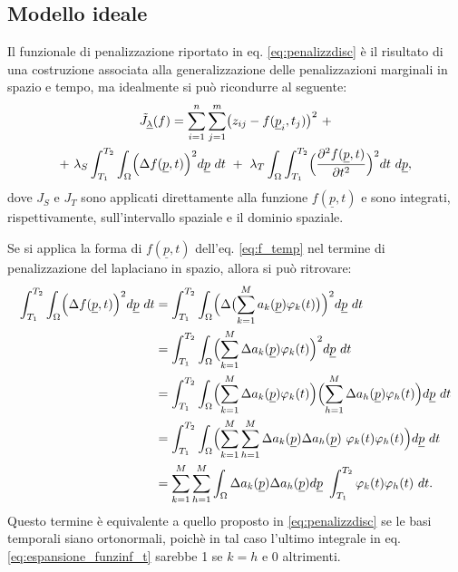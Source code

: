 \documentclass[a4paper,11pt,twoside,openright]{book}							%
\begin{document}
\subsection{Modello ideale}
Il funzionale di penalizzazione riportato in eq. \ref{eq:penalizzdisc} è il risultato di una costruzione associata alla generalizzazione delle penalizzazioni marginali in spazio e tempo, ma idealmente si può ricondurre al seguente:
\begin{multline}
\label{eq:Jfunc_cont}
\tilde J_{\underline \lambda }(f) = \sum_{i=1}^n \sum_{j=1}^m \bigl( z_{ij} - f(\underline p_i,t_j) \bigr)^2 \ + \\+\   \lambda_S \int_{T_1}^{T_2} \int_\Omega \Bigl( \Delta f(\underline p, t)  \Bigr)^2 d\underline p\ dt \ +\  \lambda_T \int_\Omega \int_{T_1}^{T_2} \Bigl( \frac{\partial^2 f(\underline p, t) }{\partial t ^2} \Bigr)^2 dt\ d\underline p ,
\end{multline}
dove $J_S$ e $J_T$ sono applicati direttamente alla funzione $f(\underline p, t)$ e sono integrati, rispettivamente, sull'intervallo spaziale e il dominio spaziale.

Se si applica la forma di $f(\underline p,t)$ dell'eq. \ref{eq:f_temp} nel termine di penalizzazione del laplaciano in spazio, allora si può ritrovare:
\begin{equation} 
\label{eq:espansione_funzinf_t}
\begin{split}
\int_{T_1}^{T_2} \int_\Omega \Bigl( \Delta f(\underline p, t)  \Bigr)^2 d\underline p\ dt 
&=\int_{T_1}^{T_2} \int_\Omega \Bigl( \Delta \bigl( \sum_{k=1}^M a_k(\underline p) \varphi_k(t) \bigr)  \Bigr)^2 d\underline p\ dt \\
&=\int_{T_1}^{T_2} \int_\Omega \Bigl( \sum_{k=1}^M \Delta a_k(\underline p) \varphi_k(t)  \Bigr)^2 d\underline p\ dt \\
&=\int_{T_1}^{T_2} \int_\Omega \Bigl( \sum_{k=1}^M \Delta a_k(\underline p) \varphi_k(t)  \Bigr)\Bigl( \sum_{h=1}^M \Delta a_h(\underline p) \varphi_h(t)  \Bigr) d\underline p\ dt \\
&=\int_{T_1}^{T_2} \int_\Omega \Bigl( \sum_{k=1}^M \sum_{h=1}^M \Delta a_k(\underline p)\Delta a_h(\underline p)\ \varphi_k(t)  \varphi_h(t)  \Bigr) d\underline p\ dt \\
&=\sum_{k=1}^M \sum_{h=1}^M \int_\Omega   \Delta a_k(\underline p) \Delta a_h(\underline p)d\underline p \ \int_{T_1}^{T_2} \varphi_k(t)\varphi_h(t)   \ dt .
\end{split}
\end{equation}
Questo termine è equivalente a quello proposto in \ref{eq:penalizzdisc} se le basi temporali siano ortonormali, poichè in tal caso l'ultimo integrale in eq. \ref{eq:espansione_funzinf_t} sarebbe 1 se $k=h$ e 0 altrimenti.
\end{document}

